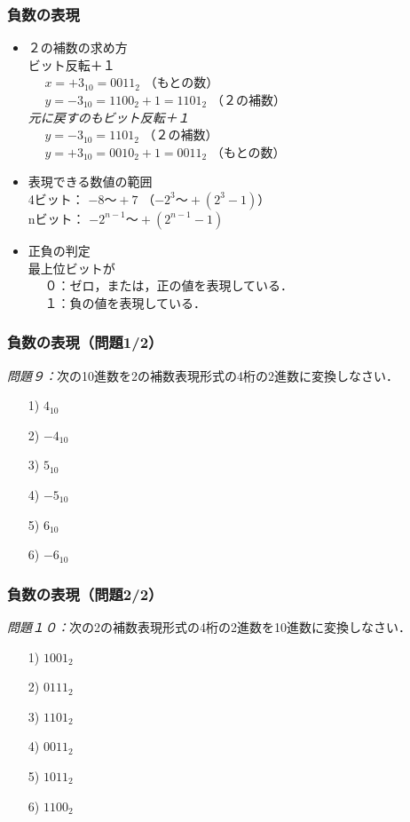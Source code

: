 \documentclass[handout]{beamer}        %
\begin{document}
\begin{frame}
  \frametitle{負数の表現}
  \begin{itemize}
  \item ２の補数の求め方 \\
    ビット反転＋１\\
    ~~ $x = +3_{10} = 0011_2$ （もとの数）\\
    ~~ $y = -3_{10} = 1100_2 + 1 = 1101_2$ （２の補数）\\
    \emph{元に戻すのもビット反転＋１}\\
    ~~ $y = -3_{10} = 1101_2$ （２の補数）\\
    ~~ $y = +3_{10} = 0010_2 + 1 = 0011_2$ （もとの数）\\
    \vfill
  \item 表現できる数値の範囲 \\
    4ビット： $-8 〜 +7$ （$-2^3〜+(2^3-1)$） \\
    nビット： $-2^{n-1} 〜 +(2^{n-1} - 1)$
    \vfill
  \item 正負の判定 \\
    最上位ビットが \\
    ~~ ０：ゼロ，または，正の値を表現している．\\
    ~~ １：負の値を表現している．
  \end{itemize}
\end{frame}

\begin{frame}
  \frametitle{負数の表現（問題1/2）}
\emph{問題９：}次の10進数を2の補数表現形式の4桁の2進数に変換しなさい．
\begin{enumerate}
\item[1)] $4_{10}$
\vfill
\item[2)] $-4_{10}$
\vfill
\item[3)] $5_{10}$
\vfill
\item[4)] $-5_{10}$
\vfill
\item[5)] $6_{10}$
\vfill
\item[6)] $-6_{10}$
\vfill
\end{enumerate}
\end{frame}

\begin{frame}
  \frametitle{負数の表現（問題2/2）}
\emph{問題１０：}次の2の補数表現形式の4桁の2進数を10進数に変換しなさい．
\begin{enumerate}
\item[1)] $1001_2$
\vfill
\item[2)] $0111_2$
\vfill
\item[3)] $1101_2$
\vfill
\item[4)] $0011_2$
\vfill
\item[5)] $1011_2$
\vfill
\item[6)] $1100_2$
\vfill
\end{enumerate}
\end{frame}
\end{document}
